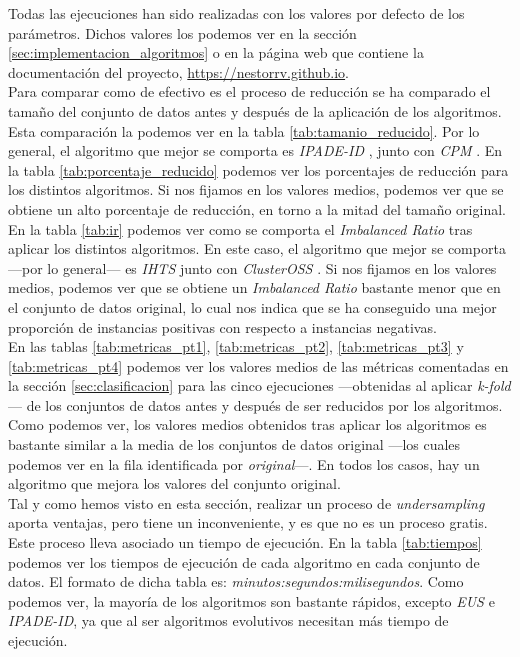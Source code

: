 Todas las ejecuciones han sido realizadas con los valores por defecto de los parámetros. Dichos valores los podemos ver en la sección \ref{sec:implementacion_algoritmos} o en la página web que contiene la documentación del proyecto, \href{https://nestorrv.github.io}{https://nestorrv.github.io}. \\

Para comparar como de efectivo es el proceso de reducción se ha comparado el tamaño del conjunto de datos antes y después de la aplicación de los algoritmos. Esta comparación la podemos ver en la tabla \ref{tab:tamanio_reducido}. Por lo general, el algoritmo que mejor se comporta es \textit{IPADE-ID} \cite{ipade}, junto con \textit{CPM} \cite{cpm}. En la tabla \ref{tab:porcentaje_reducido} podemos ver los porcentajes de reducción para los distintos algoritmos. Si nos fijamos en los valores medios, podemos ver que se obtiene un alto porcentaje de reducción, en torno a la mitad del tamaño original. \\

En la tabla \ref{tab:ir} podemos ver como se comporta el \textit{Imbalanced Ratio} tras aplicar los distintos algoritmos. En este caso, el algoritmo que mejor se comporta —por lo general— es \textit{IHTS} \cite{ihts} junto con \textit{ClusterOSS} \cite{clusteross}. Si nos fijamos en los valores medios, podemos ver que se obtiene un \textit{Imbalanced Ratio} bastante menor que en el conjunto de datos original, lo cual nos indica que se ha conseguido una mejor proporción de instancias positivas con respecto a instancias negativas. \\

En las tablas \ref{tab:metricas_pt1}, \ref{tab:metricas_pt2}, \ref{tab:metricas_pt3} y \ref{tab:metricas_pt4} podemos ver los valores medios de las métricas comentadas en la sección \ref{sec:clasificacion} para las cinco ejecuciones —obtenidas al aplicar \textit{k-fold}— de los conjuntos de datos antes y después de ser reducidos por los algoritmos. Como podemos ver, los valores medios obtenidos tras aplicar los algoritmos es bastante similar a la media de los conjuntos de datos original —los cuales podemos ver en la fila identificada por \textit{original}—. En todos los casos, hay un algoritmo que mejora los valores del conjunto original. \\

Tal y como hemos visto en esta sección, realizar un proceso de \textit{undersampling} aporta ventajas, pero tiene un inconveniente, y es que no es un proceso gratis. Este proceso lleva asociado un tiempo de ejecución. En la tabla \ref{tab:tiempos} podemos ver los tiempos de ejecución de cada algoritmo en cada conjunto de datos. El formato de dicha tabla es: \textit{minutos:segundos:milisegundos}. Como podemos ver, la mayoría de los algoritmos son bastante rápidos, excepto \textit{EUS} \cite{eus} e \textit{IPADE-ID}, ya que al ser algoritmos evolutivos necesitan más tiempo de ejecución. 

